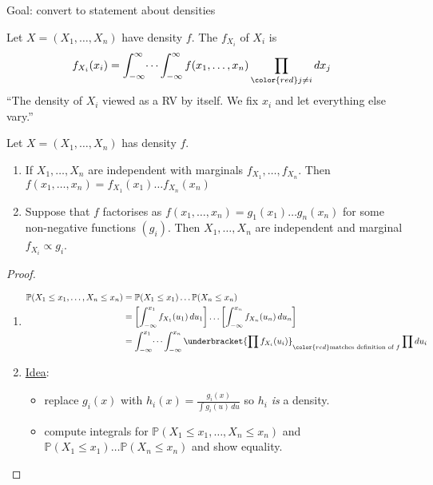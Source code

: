 Goal: convert to statement about densities

\begin{definition}
    Let $X = (X_1, \dots, X_n)$ have density $f$.
    The  $f_{X_i}$ of $X_i$ is 
    \begin{align*}
        f_{X_i}(x_i) &= \int_{-\infty}^{\infty} \dots \int_{-\infty}^{\infty} f(x_1, \dots, x_n) \prod_{\color{red} j \neq i} dx_j
    \end{align*} 
    \color{blue} ``The density of $X_i$ viewed as a RV by itself. We fix $x_i$ and let everything else vary.''
\end{definition} 

\begin{theorem}
    Let $X = (X_1,\dots,X_n)$ has density $f$.
    \begin{enumerate}
        \item If $X_1,\dots,X_n$ are independent with marginals $f_{X_1},\dots, f_{X_n}$. Then $f(x_1, \dots, x_n) = f_{X_1}(x_1) \dots f_{X_n}(x_n)$
        \item Suppose that $f$ factorises as $f(x_1, \dots, x_n) = g_1(x_1) \dots g_n(x_n)$ for some non-negative functions $(g_i)$. Then $X_1,\dots, X_n$ are independent and marginal $f_{X_i} \propto g_i$.
    \end{enumerate}
\end{theorem}

\begin{proof} ~
    \begin{enumerate}
        \item \begin{align*}
            \mathbb{P}(X_1\leq x_1,\dots, X_n\leq x_n) &= \mathbb{P}(X_1\leq x_1)\dots \mathbb{P}(X_n\leq x_n)\\
            &= \left[ \int_{-\infty}^{x_1} f_{X_1}(u_1) \,du_1 \right] \dots \left[ \int_{-\infty}^{x_n} f_{X_n}(u_n) \,du_n \right] \\
            &=\int_{-\infty}^{x_1} \dots \int_{-\infty}^{x_n} \underbracket{\prod f_{X_i}(u_i)}_{\color{red} \text{matches definition of } f} \prod du_i
        \end{align*}
        \item \underline{Idea}: \begin{itemize}
            \item replace $g_i(x)$ with $h_i(x) = \frac{g_i(x)}{\int g_i(u) \,du}$ so $h_i$ \emph{is} a density.
            \item compute integrals for $\mathbb{P}(X_1\leq x_1,\dots,X_n\leq x_n)$ and $\mathbb{P}(X_1\leq x_1)\dots \mathbb{P}(X_n\leq x_n)$ and show equality.
        \end{itemize} 
    \end{enumerate}
\end{proof}

